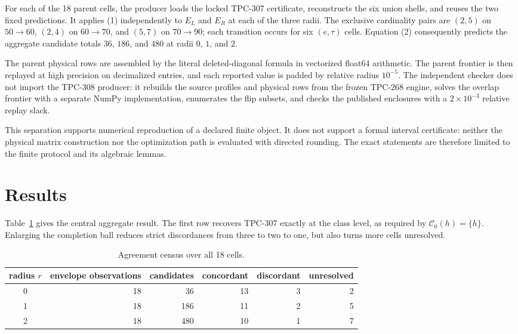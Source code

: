 \documentclass[11pt]{article}
\begin{document}
For each of the 18 parent cells, the producer loads the locked TPC-307
certificate, reconstructs the six union shells, and reuses the two fixed
predictions.  It applies (1) independently to $E_L$ and $E_R$ at each of
the three radii.  The exclusive cardinality pairs are $(2,5)$ on
$50\to60$, $(2,4)$ on $60\to70$, and $(5,7)$ on $70\to90$; each transition
occurs for six $(e,\tau)$ cells.  Equation (2) consequently predicts the
aggregate candidate totals $36$, $186$, and $480$ at radii $0$, $1$, and
$2$.

The parent physical rows are assembled by the literal deleted-diagonal
formula in vectorized float64 arithmetic.  The parent frontier is then
replayed at high precision on decimalized entries, and each reported value
is padded by relative radius $10^{-5}$.  The independent checker does not
import the TPC-308 producer: it rebuilds the source profiles and physical
rows from the frozen TPC-268 engine, solves the overlap frontier with a
separate NumPy implementation, enumerates the flip subsets, and checks the
published enclosures with a $2\times10^{-3}$ relative replay slack.

This separation supports numerical reproduction of a declared finite object.
It does not support a formal interval certificate: neither the physical
matrix construction nor the optimization path is evaluated with directed
rounding.  The exact statements are therefore limited to the finite
protocol and its algebraic lemmas.

\section{Results}

Table~\ref{tab:radius} gives the central aggregate result.  The first row
recovers TPC-307 exactly at the class level, as required by
$\mathcal C_0(h)=\{h\}$.  Enlarging the completion ball reduces strict
discordances from three to two to one, but also turns more cells unresolved.

\begin{table}[t]
\centering\small
\caption{Agreement census over all 18 cells.}
\label{tab:radius}
\begin{tabular}{c r r r r r}
\toprule
radius $r$ & envelope observations & candidates & concordant & discordant & unresolved\\
\midrule
0 & 18 & 36  & 13 & 3 & 2\\
1 & 18 & 186 & 11 & 2 & 5\\
2 & 18 & 480 & 10 & 1 & 7\\
\bottomrule
\end{tabular}
\end{table}
\end{document}
